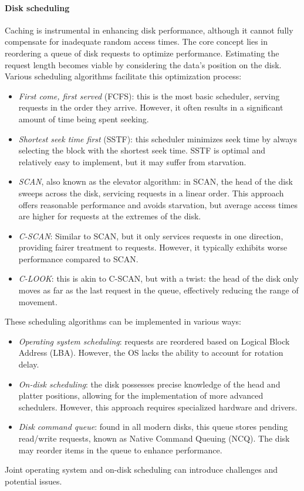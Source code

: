 \paragraph*{Disk scheduling}
Caching is instrumental in enhancing disk performance, although it cannot fully compensate for inadequate random access times. 
The core concept lies in reordering a queue of disk requests to optimize performance. 
Estimating the request length becomes viable by considering the data's position on the disk.
Various scheduling algorithms facilitate this optimization process:
\begin{itemize}
    \item \textit{First come, first served} (FCFS): this is the most basic scheduler, serving requests in the order they arrive. 
        However, it often results in a significant amount of time being spent seeking.
    \item \textit{Shortest seek time first} (SSTF): this scheduler minimizes seek time by always selecting the block with the shortest seek time. 
        SSTF is optimal and relatively easy to implement, but it may suffer from starvation.
    \item \textit{SCAN}, also known as the elevator algorithm: in SCAN, the head of the disk sweeps across the disk, servicing requests in a linear order. 
        This approach offers reasonable performance and avoids starvation, but average access times are higher for requests at the extremes of the disk.
    \item \textit{C-SCAN}: Similar to SCAN, but it only services requests in one direction, providing fairer treatment to requests. 
        However, it typically exhibits worse performance compared to SCAN.\@
    \item \textit{C-LOOK}: this is akin to C-SCAN, but with a twist: the head of the disk only moves as far as the last request in the queue, effectively reducing the range of movement.
\end{itemize}
These scheduling algorithms can be implemented in various ways:
\begin{itemize}
    \item \textit{Operating system scheduling}: requests are reordered based on Logical Block Address (LBA). 
        However, the OS lacks the ability to account for rotation delay.
    \item \textit{On-disk scheduling}: the disk possesses precise knowledge of the head and platter positions, allowing for the implementation of more advanced schedulers. 
        However, this approach requires specialized hardware and drivers.
    \item \textit{Disk command queue}: found in all modern disks, this queue stores pending read/write requests, known as Native Command Queuing (NCQ). 
        The disk may reorder items in the queue to enhance performance.
\end{itemize}
Joint operating system and on-disk scheduling can introduce challenges and potential issues.

